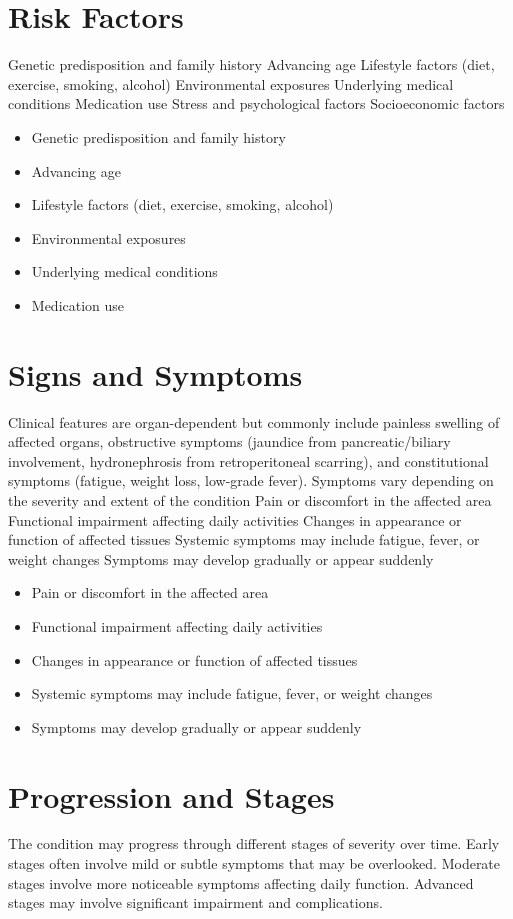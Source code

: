 \section{Risk Factors}
Genetic predisposition and family history Advancing age Lifestyle factors (diet, exercise, smoking, alcohol) Environmental exposures Underlying medical conditions Medication use Stress and psychological factors Socioeconomic factors

\begin{itemize}[noitemsep]
  \item Genetic predisposition and family history
  \item Advancing age
  \item Lifestyle factors (diet, exercise, smoking, alcohol)
  \item Environmental exposures
  \item Underlying medical conditions
  \item Medication use
\end{itemize}
\section{Signs and Symptoms}
Clinical features are organ-dependent but commonly include painless swelling of affected organs, obstructive symptoms (jaundice from pancreatic/biliary involvement, hydronephrosis from retroperitoneal scarring), and constitutional symptoms (fatigue, weight loss, low-grade fever). Symptoms vary depending on the severity and extent of the condition Pain or discomfort in the affected area Functional impairment affecting daily activities Changes in appearance or function of affected tissues Systemic symptoms may include fatigue, fever, or weight changes Symptoms may develop gradually or appear suddenly

\begin{itemize}[noitemsep]
  \item Pain or discomfort in the affected area
  \item Functional impairment affecting daily activities
  \item Changes in appearance or function of affected tissues
  \item Systemic symptoms may include fatigue, fever, or weight changes
  \item Symptoms may develop gradually or appear suddenly
\end{itemize}
\section{Progression and Stages}
The condition may progress through different stages of severity over time. Early stages often involve mild or subtle symptoms that may be overlooked. Moderate stages involve more noticeable symptoms affecting daily function. Advanced stages may involve significant impairment and complications.
